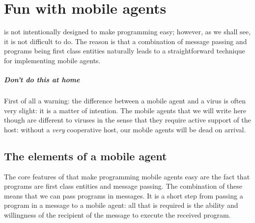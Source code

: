\chapter{Fun with mobile agents}
\label{mobile}

\go is not intentionally designed to make programming   easy; however, as we shall see, it is not difficult to do. The reason is that a combination of message passing and programs being first class entities naturally leads to a straightforward technique for implementing mobile agents.

\paragraph{Don't do this at home}
First of all a warning: the difference between a mobile agent and a virus is often very slight: it is a matter of intention. The mobile agents that we will write here though are different to viruses in the sense that they require active support of the host: without a \emph{very} cooperative host, our mobile agents will be dead on arrival.

\section{The elements of a mobile agent}
The core features of \go that make programming mobile agents easy are the fact that programs are first class entities and message passing. The combination of these means that we can pass programs in messages. It is a short step from passing a program in a message to a mobile agent: all that is required is the ability and willingness of the recipient of the message to execute the received program.


